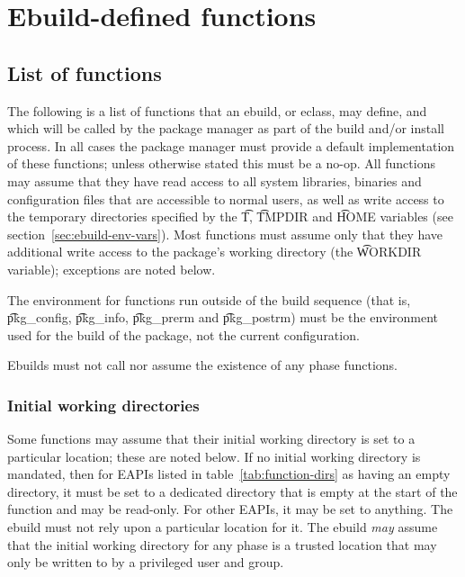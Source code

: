 \chapter{Ebuild-defined functions}
\label{ch:ebuild-functions}

\section{List of functions}

The following is a list of functions that an ebuild, or eclass, may define, and which will be called
by the package manager as part of the build and/or install process. In all cases the package manager
must provide a default implementation of these functions; unless otherwise stated this must be a
no-op. All functions may assume that they have read access to all system libraries, binaries and
configuration files that are accessible to normal users, as well as write access to the temporary
directories specified by the \t{T}, \t{TMPDIR} and \t{HOME} variables
(see section~\ref{sec:ebuild-env-vars}). Most functions must assume only that they have additional
write access to the package's working directory (the \t{WORKDIR} variable); exceptions are noted
below.

The environment for functions run outside of the build sequence (that is, \t{pkg_config},
\t{pkg_info}, \t{pkg_prerm} and \t{pkg_postrm}) must be the environment used for the build of the
package, not the current configuration.

Ebuilds must not call nor assume the existence of any phase functions.

\subsection{Initial working directories}
\label{sec:s-to-workdir-fallback}

 Some functions may assume that their initial working directory is
set to a particular location; these are noted below. If no initial working directory is mandated,
then for EAPIs listed in table~\ref{tab:function-dirs} as having an empty directory, it must be set
to a dedicated directory that is empty at the start of the function and may be read-only. For other
EAPIs, it may be set to anything. The ebuild must not rely upon a particular location for it.
The ebuild \emph{may} assume that the initial working directory for any phase is a trusted location
that may only be written to by a privileged user and group.


